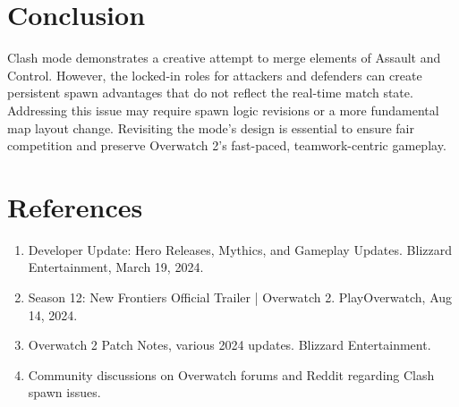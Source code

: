 \documentclass[12pt]{article}
\begin{document}
\section{Conclusion}
Clash mode demonstrates a creative attempt to merge elements of Assault and Control. 
However, the locked-in roles for attackers and defenders can create persistent 
spawn advantages that do not reflect the real-time match state. Addressing this 
issue may require spawn logic revisions or a more fundamental map layout change. 
Revisiting the mode’s design is essential to ensure fair competition and preserve 
Overwatch 2’s fast-paced, teamwork-centric gameplay.

\appendix
\section{References}
\begin{enumerate}
    \item Developer Update: Hero Releases, Mythics, and Gameplay Updates. Blizzard 
    Entertainment, March 19, 2024.
    \item Season 12: New Frontiers Official Trailer | Overwatch 2. PlayOverwatch, Aug 14, 2024.
    \item Overwatch 2 Patch Notes, various 2024 updates. Blizzard Entertainment.
    \item Community discussions on Overwatch forums and Reddit regarding Clash spawn 
    issues. 
\end{enumerate}
\end{document}
